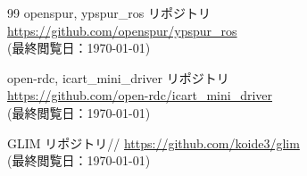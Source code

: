 \documentclass[uplatex, twocolumn, 9pt]{jsproceedings}
\begin{document}
\begin{thebibliography}{99}
openspur, ypspur\_ros リポジトリ\\
\url{https://github.com/openspur/ypspur_ros}\\
(最終閲覧日：\today)

open-rdc, icart\_mini\_driver リポジトリ\\
\url{https://github.com/open-rdc/icart_mini_driver}\\
(最終閲覧日：\today)


GLIM リポジトリ//
\url{https://github.com/koide3/glim}\\
(最終閲覧日：\today)

\end{thebibliography}
\normalsize
\end{document}
